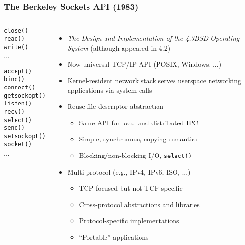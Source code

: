 \begin{frame}
  \frametitle{The Berkeley Sockets API (1983)}

  \begin{columns}[T]
      \bigskip
      \begin{scriptsize}
	\texttt{close()} \\
	\texttt{read()} \\
	\texttt{write()} \\
	...

	\bigskip

	\texttt{accept()} \\
	\texttt{bind()} \\
	\texttt{connect()} \\
	\texttt{getsockopt()} \\
	\texttt{listen()} \\
	\texttt{recv()} \\
	\texttt{select()} \\
	\texttt{send()} \\
	\texttt{setsockopt()} \\
	\texttt{socket()} \\
	...
      \end{scriptsize}

    \pause

    \begin{itemize}
      \item \textit{The Design and Implementation of the 4.3BSD Operating
	System} (although appeared in 4.2)
      \item Now universal TCP/IP API (POSIX, Windows, ...)

      \pause
      \medskip

      \item Kernel-resident network stack serves userspace networking
	applications via system calls
      \item Reuse file-descriptor abstraction
      \begin{itemize}
	\item Same API for local and distributed IPC
	\item Simple, synchronous, copying semantics
	\item Blocking/non-blocking I/O, \texttt{select()}
      \end{itemize}

      \pause
      \medskip

      \item Multi-protocol (e.g., IPv4, IPv6, ISO, ...)
      \begin{itemize}
	\item TCP-focused but not TCP-specific
	\item Cross-protocol abstractions and libraries
	\item Protocol-specific implementations
	\item ``Portable'' applications
      \end{itemize}


\end{itemize}
\end{columns}
\end{frame}
